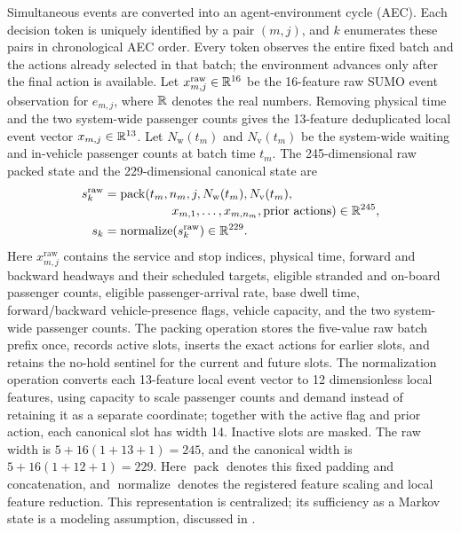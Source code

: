 Simultaneous events are converted into an agent-environment cycle (AEC). Each
decision token is uniquely identified by a pair $(m,j)$, and $k$ enumerates
these pairs in chronological AEC order. Every token observes the entire fixed
batch and the actions already selected in that batch; the environment advances
only after the final action is available. Let
$x^{\mathrm{raw}}_{m,j}\in\mathbb{R}^{16}$ be the 16-feature raw SUMO event observation
for $e_{m,j}$, where $\mathbb{R}$ denotes the real numbers. Removing physical time and
the two system-wide passenger counts gives the 13-feature deduplicated local
event vector $x_{m,j}\in\mathbb{R}^{13}$. Let $N_{\mathrm{w}}(t_m)$ and
$N_{\mathrm{v}}(t_m)$ be the system-wide waiting and in-vehicle passenger
counts at batch time $t_m$. The 245-dimensional raw packed state and the
229-dimensional canonical state are
\begin{equation}
\begin{aligned}
s^{\mathrm{raw}}_k
&=\operatorname{pack}\!\left(
t_m,n_m,j,N_{\mathrm{w}}(t_m),N_{\mathrm{v}}(t_m),
\right.\\[-0.25em]
&\hspace{5.2em}\left.
x_{m,1},\ldots,x_{m,n_m},\text{prior actions}
\right)\in\mathbb{R}^{245},\\
s_k&=\operatorname{normalize}(s^{\mathrm{raw}}_k)\in\mathbb{R}^{229}.
\end{aligned}
\label{eq:v7_state}
\end{equation}
Here $x^{\mathrm{raw}}_{m,j}$ contains the service and stop indices, physical
time, forward and backward headways and their scheduled targets, eligible
stranded and on-board passenger counts, eligible passenger-arrival rate, base
dwell time, forward/backward vehicle-presence flags, vehicle capacity, and the
two system-wide passenger counts. The packing operation stores the five-value
raw batch prefix once, records active slots, inserts the exact actions for
earlier slots, and retains the no-hold sentinel for the current and future
slots. The normalization operation converts each 13-feature local event vector
to 12 dimensionless local features, using capacity to scale passenger counts
and demand instead of retaining it as a separate coordinate; together with the active flag and prior
action, each canonical slot has width 14. Inactive slots are masked.
The raw width is $5+16(1+13+1)=245$, and the canonical width is
$5+16(1+12+1)=229$. Here \(\operatorname{pack}\) denotes this fixed padding
and concatenation, and \(\operatorname{normalize}\) denotes the registered
feature scaling and local feature reduction.
This representation is centralized; its sufficiency as a Markov state is a
modeling assumption, discussed in .

